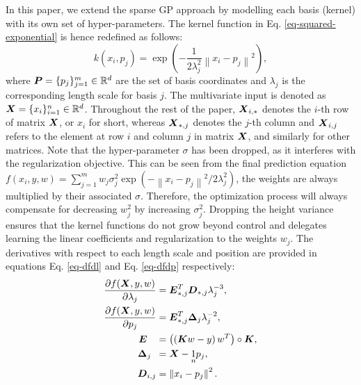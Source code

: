 \documentclass[useAMS,usenatbib,fleqn]{mn2e}
\begin{document}
In this paper, we extend the sparse GP approach by modelling each basis (kernel) with its own set of hyper-parameters. The kernel function in Eq. \eqref{eq-squared-exponential} is hence redefined as follows:
\begin{equation}
\label{eq-squared-exponential-extension}
k(x_{i},p_{j}) = \exp{\left(-\frac{1}{2\lambda_{j}^{2}}\left\| x_{i}-p_{j}\right\|^{2}\right)},
\end{equation}
where $\bmath{P}=\{p_{j}\}_{j=1}^{m} \in \mathbb{R}^{d}$ are the set of basis coordinates and $\lambda_{j}$ is the corresponding length scale for basis $j$. The multivariate input is denoted as $\bmath{X}=\{x_{i}\}_{i=1}^{n} \in \mathbb{R}^{d}$. Throughout the rest of the paper, $\bmath{X}_{i,*}$ denotes the $i$-th row of matrix $\bmath{X}$, or $x_{i}$ for short, whereas $\bmath{X}_{*,j}$ denotes the $j$-th column and $\bmath{X}_{i,j}$ refers to the element at row $i$ and column $j$ in matrix $\bmath{X}$, and similarly for other matrices. Note that the hyper-parameter $\sigma$ has been dropped, as it interferes with the regularization objective. This can be seen from the final prediction equation $f(x_{i},y,w)=\sum_{j=1}^{m}w_{j}\sigma_{j}^{2}\exp{\left(-\left\| x_{i}-p_{j}\right\|^{2}/2\lambda_{j}^{2}\right)}$, the weights are always multiplied by their associated $\sigma$. Therefore, the optimization process will always compensate for decreasing $w_{j}^{2}$ by increasing $\sigma_{j}^{2}$. Dropping the height variance ensures that the kernel functions do not grow beyond control and delegates learning the linear coefficients and regularization to the weights $w_{j}$. The derivatives with respect to each length scale and position are provided in equations Eq. \eqref{eq-dfdl} and Eq. \eqref{eq-dfdp} respectively:
\begin{subequations}
\begin{align}
\label{eq-dfdl}
\frac{\partial f(\bmath{X},y,w)}{\partial \lambda_{j}} &=\bmath{E}_{*,j}^{T}\bmath{D}_{*,j}\lambda_{j}^{-3},\\
\label{eq-dfdp}
\frac{\partial f(\bmath{X},y,w)}{\partial p_{j}} &=\bmath{E}_{*,j}^{T}\mathbf\Delta_{j}\lambda_{j}^{-2},\\
\bmath{E}\phantom{_{i,j}} &= \left(\left(\bmath{K}w-y\right)w^{T}\right)\circ\bmath{K},\\
\mathbf\Delta_{j\phantom{,i}} &= \bmath{X}-\underset{n}{1}p_{j},\\
\bmath{D}_{i,j} &= \left \| x_{i}-p_{j}\right\|^{2}.
\end{align}
\end{subequations}
\end{document}
